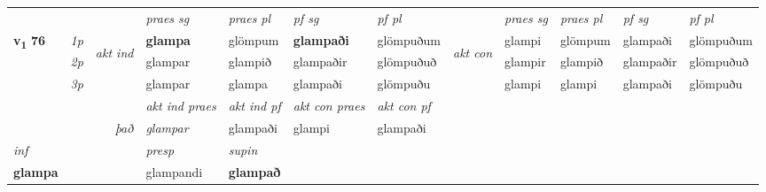\begin{longtable}[l]{X>{\footnotesize\itshape}llXXXXlXXXX}
 & &   & \textit{praes sg}  & \textit{praes pl}    & \textit{ pf sg} & \textit{pf pl} & & \textit{praes sg}  & \textit{praes pl}    & \textit{pf sg} & \textit{pf pl }  \\ \cmidrule{4-7} \cmidrule{9-12}
 \multirow{2}{*}{{{\textbf{v{\textsubscript{1}}} \Large{\textbf{76}}}}}  & 1p & \multirow{3}{*}{\begin{turn}{90}\textit{akt ind}\end{turn}} & \textbf{glampa} & glömpum & \textbf{glampaði} & glömpuðum & \multirow{3}{*}{\begin{turn}{90}\textit{akt con}\end{turn}} &glampi & glömpum & glampaði & glömpuðum\\*
 & 2p &  &  glampar  & glampið & glampaðir & glömpuðuð & & glampir & glampið & glampaðir & glömpuðuð \\*
 & 3p &  & glampar & glampa & glampaði & glömpuðu & & glampi & glampi& glampaði & glömpuðu \\*
\cmidrule{4-7} \cmidrule{9-12}

   && &  \textit{akt ind praes} & \textit{akt ind pf} & \textit{akt con praes} & \textit{akt con pf} \\*
\multicolumn{3}{r}{\textit{það}} & glampar & glampaði & glampi & glampaði \\*

\cmidrule{4-7}
   {\textit{inf}} & &     & \textit{presp} & \textit{supin}   \\*
  {\textbf{glampa}} & &     & glampandi &  \textbf{glampað}   \\*

\midrule


\end{longtable}
